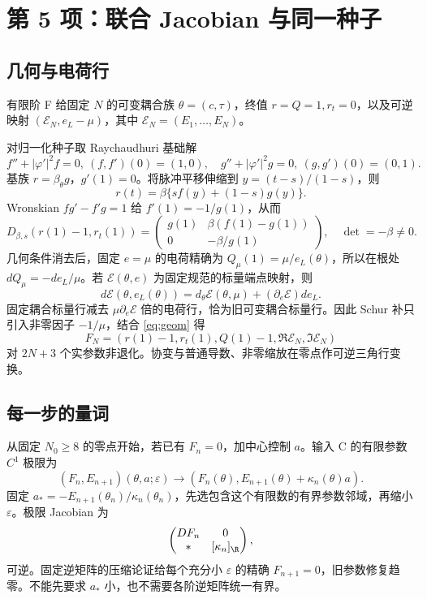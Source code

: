\section{第 5 项：联合 Jacobian 与同一种子}
\subsection{几何与电荷行}
有限阶 F 给固定 $N$ 的可变耦合族 $\theta=(c,\tau)$，终值 $r=Q=1,r_t=0$，以及可逆映射 $(\mathcal E_N,e_L-\mu)$，其中 $\mathcal E_N=(E_1,\ldots,E_N)$。

对归一化种子取 Raychaudhuri 基础解
\[
f''+|\varphi'|^2f=0,\ (f,f')(0)=(1,0),\quad
g''+|\varphi'|^2g=0,\ (g,g')(0)=(0,1).
\]
基族 $r=\beta_\theta g$，$g'(1)=0$。将脉冲平移伸缩到 $y=(t-s)/(1-s)$，则
\[
r(t)=\beta\{sf(y)+(1-s)g(y)\}.
\]
Wronskian $fg'-f'g=1$ 给 $f'(1)=-1/g(1)$，从而
\begin{equation}\label{eq:geom}
D_{\beta,s}(r(1)-1,r_t(1))=
\begin{pmatrix}g(1)&\beta(f(1)-g(1))\\0&-\beta/g(1)\end{pmatrix},
\quad\det=-\beta\ne0.
\end{equation}
几何条件消去后，固定 $e=\mu$ 的电荷精确为 $Q_\mu(1)=\mu/e_L(\theta)$，所以在根处 $dQ_\mu=-de_L/\mu$。若 $\mathcal E(\theta,e)$ 为固定规范的标量端点映射，则
\[
d\mathcal E(\theta,e_L(\theta))
=d_\theta\mathcal E(\theta,\mu)+(\partial_e\mathcal E)de_L.
\]
固定耦合标量行减去 $\mu\partial_e\mathcal E$ 倍的电荷行，恰为旧可变耦合标量行。因此 Schur 补只引入非零因子 $-1/\mu$，结合 \eqref{eq:geom} 得
\[
F_N=(r(1)-1,r_t(1),Q(1)-1,\Re\mathcal E_N,\Im\mathcal E_N)
\]
对 $2N+3$ 个实参数非退化。协变与普通导数、非零缩放在零点作可逆三角行变换。

\subsection{每一步的量词}
从固定 $N_0\ge8$ 的零点开始，若已有 $F_n=0$，加中心控制 $a$。输入 C 的有限参数 $C^1$ 极限为
\[
(F_n,E_{n+1})(\theta,a;\varepsilon)
\longrightarrow(F_n(\theta),E_{n+1}(\theta)+\kappa_n(\theta)a).
\]
固定 $a_*=-E_{n+1}(\theta_n)/\kappa_n(\theta_n)$，先选包含这个有限数的有界参数邻域，再缩小 $\varepsilon$。极限 Jacobian 为
\[
\begin{pmatrix}DF_n&0\\ *&[\kappa_n]_{\R}\end{pmatrix},
\]
可逆。固定逆矩阵的压缩论证给每个充分小 $\varepsilon$ 的精确 $F_{n+1}=0$，旧参数修复趋零。不能先要求 $a_*$ 小，也不需要各阶逆矩阵统一有界。

